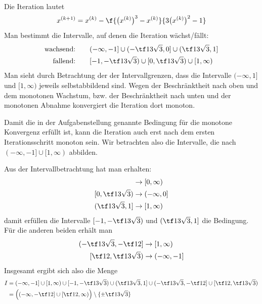 \documentclass[a4paper]{scrartcl}
\begin{document}
\begin{aufgabe}~

	Die Iteration lautet
	\[
		x^{(k+1)} = x^{(k)} - \f {\big(x^{(k)}\big)^3 - x^{(k)}}{3\big(x^{(k)}\big)^2 - 1}
	\]
	Man bestimmt die Intervalle, auf denen die Iteration wächst/fällt:
	\begin{align*}
		\text{wachsend:} &\qquad (-\infty,-1] \cup (-\tf 13\sqrt 3, 0] \cup (\tf 13\sqrt 3, 1] \\
		\text{fallend:} &\qquad [-1, -\tf 13\sqrt 3) \cup [0,\tf 13 \sqrt3) \cup [1,\infty)
	\end{align*}
	Man sieht durch Betrachtung der der Intervallgrenzen, dass die Intervalle $(-\infty, 1]$ und $[1,\infty)$ jeweils selbstabbildend sind.
	Wegen der Beschränktheit nach oben und dem monotonen Wachstum, bzw. der Beschränktheit nach unten und der monotonen Abnahme konvergiert die Iteration dort monoton.

	Damit die in der Aufgabenstellung genannte Bedingung für die monotone Konvergenz erfüllt ist, kann die Iteration auch erst nach dem ersten Iterationsschritt monoton sein.
	Wir betrachten also die Intervalle, die nach $(-\infty, -1] \cup [1,\infty)$ abbilden.

	Aus der Intervallbetrachtung hat man erhalten:
	\begin{align*}
		[-1, -\tf13 \sqrt 3) &\to (-\infty, -1) \\
		(-\tf13 \sqrt 3, 0] &\to [0, \infty) \\
		[0, \tf13 \sqrt 3) &\to (-\infty, 0] \\
		(\tf13 \sqrt3, 1] &\to [1, \infty)
	\end{align*}
	damit erfüllen die Intervalle $[-1,-\tf 13 \sqrt3)$ und $(\tf13 \sqrt3, 1]$ die Bedingung.
	Für die anderen beiden erhält man
	\begin{align*}
		(-\tf13 \sqrt3, -\tf 12] &\to [1,\infty) \\
		[\tf 12, \tf13 \sqrt3) &\to (-\infty, -1]
	\end{align*}
	Insgesamt ergibt sich also die Menge
	\begin{align*}
		I &= (-\infty, -1] \cup [1,\infty) \cup [-1,-\tf 13 \sqrt3) \cup (\tf13 \sqrt3, 1] \cup
		(-\tf13 \sqrt3, -\tf 12] \cup
		[\tf 12, \tf13 \sqrt3) \\
		&= \Big( (-\infty, -\tf 12] \cup [\tf 12, \infty) \Big) \setminus \{\pm \tf13 \sqrt 3\}
	\end{align*}
\end{aufgabe}
\newpage
\end{document}
